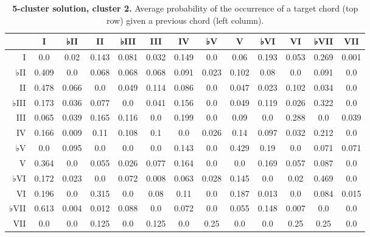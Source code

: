 \begin{table}[htbp]
\begin{minipage}{\linewidth}
\setlength{\tymax}{0.5\linewidth}
\centering
\small
\caption{\textbf{5-cluster solution, cluster 2.} Average probability of the occurrence of a target chord (top row) given a previous chord (left column).}
\label{5-clustersolutioncluster2.averageprobabilityoftheoccurrenceofatargetchordtoprowgivenapreviouschordleftcolumn.}
\begin{tabulary}{\textwidth}{@{}RCCCCCCCCCCCC@{}} \toprule
&I&♭II&II&♭III&III&IV&♭V&V&♭VI&VI&♭VII&VII\\
\midrule
I&0.0&0.02&0.143&0.081&0.032&0.149&0.0&0.06&0.193&0.053&0.269&0.001\\
♭II&0.409&0.0&0.068&0.068&0.068&0.091&0.023&0.102&0.08&0.0&0.091&0.0\\
II&0.478&0.066&0.0&0.049&0.114&0.086&0.0&0.047&0.023&0.102&0.034&0.0\\
♭III&0.173&0.036&0.077&0.0&0.041&0.156&0.0&0.049&0.119&0.026&0.322&0.0\\
III&0.065&0.039&0.165&0.116&0.0&0.199&0.0&0.09&0.0&0.288&0.0&0.039\\
IV&0.166&0.009&0.11&0.108&0.1&0.0&0.026&0.14&0.097&0.032&0.212&0.0\\
♭V&0.0&0.095&0.0&0.0&0.0&0.143&0.0&0.429&0.19&0.0&0.071&0.071\\
V&0.364&0.0&0.055&0.026&0.077&0.164&0.0&0.0&0.169&0.057&0.087&0.0\\
♭VI&0.172&0.023&0.0&0.072&0.008&0.063&0.028&0.145&0.0&0.02&0.469&0.0\\
VI&0.196&0.0&0.315&0.0&0.08&0.11&0.0&0.187&0.013&0.0&0.084&0.015\\
♭VII&0.613&0.004&0.012&0.088&0.0&0.072&0.0&0.055&0.148&0.007&0.0&0.0\\
VII&0.0&0.0&0.125&0.0&0.125&0.0&0.25&0.0&0.0&0.25&0.25&0.0\\

\bottomrule

\end{tabulary}
\end{minipage}
\end{table}

